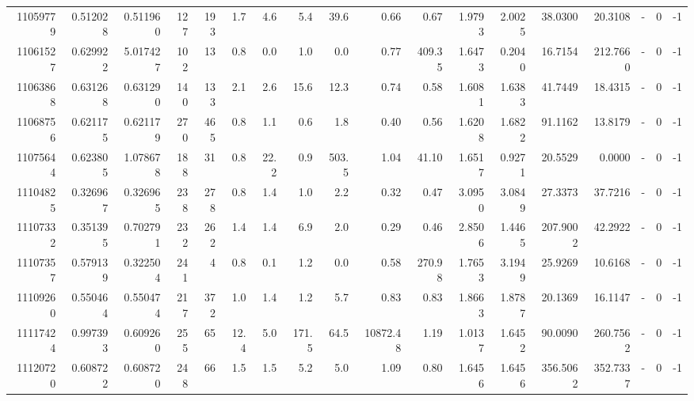 \begin{tabular}{rrrrrrrrrrrrrrrlrr}
  11059779 & 0.512028 &   0.511960 &  127 &  193 &      1.7 &      4.6 &     5.4 &     39.6 &       0.66 &        0.67 &  1.9793 &  2.0025 &   38.0300 &   20.3108 &             - &        0 &         -1 \\
  11061527 & 0.629922 &   5.017427 &  102 &   13 &      0.8 &      0.0 &     1.0 &      0.0 &       0.77 &      409.35 &  1.6473 &  0.2040 &   16.7154 &  212.7660 &             - &        0 &         -1 \\
  11063868 & 0.631268 &   0.631290 &  140 &  133 &      2.1 &      2.6 &    15.6 &     12.3 &       0.74 &        0.58 &  1.6081 &  1.6383 &   41.7449 &   18.4315 &             - &        0 &         -1 \\
  11068756 & 0.621175 &   0.621179 &  270 &  465 &      0.8 &      1.1 &     0.6 &      1.8 &       0.40 &        0.56 &  1.6208 &  1.6822 &   91.1162 &   13.8179 &             - &        0 &         -1 \\
  11075644 & 0.623805 &   1.078678 &  188 &   31 &      0.8 &     22.2 &     0.9 &    503.5 &       1.04 &       41.10 &  1.6517 &  0.9271 &   20.5529 &    0.0000 &             - &        0 &         -1 \\
  11104825 & 0.326967 &   0.326965 &  238 &  278 &      0.8 &      1.4 &     1.0 &      2.2 &       0.32 &        0.47 &  3.0950 &  3.0849 &   27.3373 &   37.7216 &             - &        0 &         -1 \\
  11107332 & 0.351395 &   0.702791 &  232 &  262 &      1.4 &      1.4 &     6.9 &      2.0 &       0.29 &        0.46 &  2.8506 &  1.4465 &  207.9002 &   42.2922 &             - &        0 &         -1 \\
  11107357 & 0.579139 &   0.322504 &  241 &    4 &      0.8 &      0.1 &     1.2 &      0.0 &       0.58 &      270.98 &  1.7653 &  3.1949 &   25.9269 &   10.6168 &             - &        0 &         -1 \\
  11109260 & 0.550464 &   0.550474 &  217 &  372 &      1.0 &      1.4 &     1.2 &      5.7 &       0.83 &        0.83 &  1.8663 &  1.8787 &   20.1369 &   16.1147 &             - &        0 &         -1 \\
  11117424 & 0.997393 &   0.609260 &  255 &   65 &     12.4 &      5.0 &   171.5 &     64.5 &   10872.48 &        1.19 &  1.0137 &  1.6452 &   90.0090 &  260.7562 &             - &        0 &         -1 \\
  11120720 & 0.608722 &   0.608720 &  248 &   66 &      1.5 &      1.5 &     5.2 &      5.0 &       1.09 &        0.80 &  1.6456 &  1.6456 &  356.5062 &  352.7337 &             - &        0 &         -1 \\

\end{tabular}

